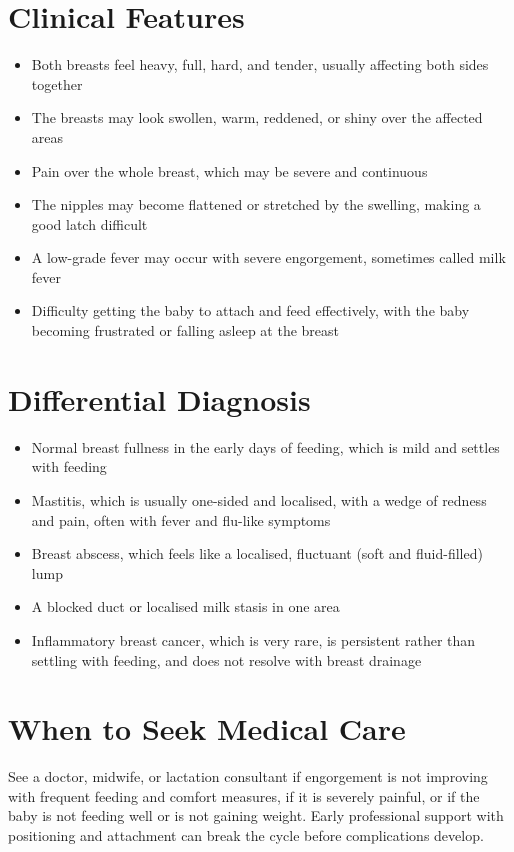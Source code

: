 \section*{Clinical Features}
\begin{itemize}
    \item Both breasts feel heavy, full, hard, and tender, usually affecting both sides together
    \item The breasts may look swollen, warm, reddened, or shiny over the affected areas
    \item Pain over the whole breast, which may be severe and continuous
    \item The nipples may become flattened or stretched by the swelling, making a good latch difficult
    \item A low-grade fever may occur with severe engorgement, sometimes called milk fever
    \item Difficulty getting the baby to attach and feed effectively, with the baby becoming frustrated or falling asleep at the breast
\end{itemize}

\section*{Differential Diagnosis}
\begin{itemize}
    \item Normal breast fullness in the early days of feeding, which is mild and settles with feeding
    \item Mastitis, which is usually one-sided and localised, with a wedge of redness and pain, often with fever and flu-like symptoms
    \item Breast abscess, which feels like a localised, fluctuant (soft and fluid-filled) lump
    \item A blocked duct or localised milk stasis in one area
    \item Inflammatory breast cancer, which is very rare, is persistent rather than settling with feeding, and does not resolve with breast drainage
\end{itemize}

\section*{When to Seek Medical Care}
See a doctor, midwife, or lactation consultant if engorgement is not improving with frequent feeding and comfort measures, if it is severely painful, or if the baby is not feeding well or is not gaining weight. Early professional support with positioning and attachment can break the cycle before complications develop.

